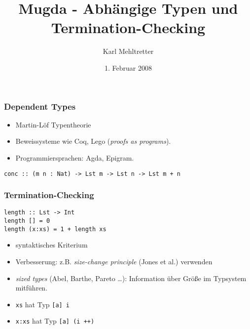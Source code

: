\documentclass[12pt,red,serif,mathserif]{beamer}
\title{Mugda - Abh\"angige Typen und Termination-Checking}
\author{Karl Mehltretter}
\date{1. Februar 2008}
\begin{document}
\frame{\titlepage}



\begin{frame}[fragile]

  \frametitle{Dependent Types}

\begin{itemize}
\item
Martin-L\"of Typentheorie
\item
Beweissysteme wie Coq, Lego (\emph{proofs as programs}).
\item
Programmiersprachen: Agda, Epigram.
\end{itemize}
\vspace*{0.4cm}
\verb.conc :: (m n : Nat) -> Lst m -> Lst n -> Lst m + n.
\end{frame}

\begin{frame}[fragile]

  \frametitle{Termination-Checking}

\begin{verbatim}
length :: Lst -> Int
length [] = 0
length (x:xs) = 1 + length xs 
\end{verbatim}

\begin{itemize}
\item
syntaktisches Kriterium 
\item
Verbesserung: z.B. \emph{size-change principle} (Jones et al.) verwenden
\end{itemize}
\begin{itemize}
\item
\emph{sized types} (Abel, Barthe, Pareto \dots): Information \"uber Gr\"o\ss e im Typsystem mitf\"uhren.
\item
\verb+xs+ hat Typ \verb+[a] i+
\item
\verb+x:xs+ hat Typ \verb-[a] (i ++)-  
\end{itemize}

\end{frame}
\end{document}
